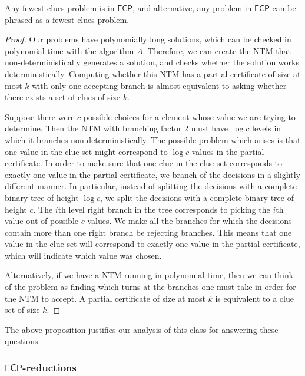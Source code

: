 \documentclass[runningheads,a4paper]{llncs}
\begin{document}
\begin{proposition}
Any fewest clues problem is in $\mathsf{FCP}$, and alternative, any problem in $\mathsf{FCP}$ can be phrased as a fewest clues problem.
\end{proposition}

\begin{proof}
Our problems have polynomially long solutions, which can be checked in polynomial time with the algorithm $A$. Therefore, we can create the NTM that non-deterministically generates a solution, and checks whether the solution works deterministically. Computing whether this NTM has a partial certificate of size at most $k$ with only one accepting branch is almost equivalent to asking whether there exists a set of clues of size $k$. 

Suppose there were $c$ possible choices for a element whose value we are trying to determine. Then the NTM with branching factor $2$ must have $\log c$ levels in which it branches non-deterministically. The possible problem which arises is that one value in the clue set might correspond to $\log c$ values in the partial certificate. In order to make sure that one clue in the clue set corresponds to exactly one value in the partial certificate, we branch of the decisions in a slightly different manner. In particular, instead of splitting the decisions with a complete binary tree of height $\log c$, we split the decisions with a complete binary tree of height $c$. The $i$th level right branch in the tree corresponds to picking the $i$th value out of possible $c$ values. We make all the branches for which the decisions contain more than one right branch be rejecting branches. This means that one value in the clue set will correspond to exactly one value in the partial certificate, which will indicate which value was chosen.

Alternatively, if we have a NTM running in polynomial time, then we can think of the problem as finding which turns at the branches one must take in order for the NTM to accept. A partial certificate of size at most $k$ is equivalent to a clue set of size $k$.
\end{proof}

The above proposition justifies our analysis of this class for answering these questions.

\subsubsection{$\mathsf{FCP}$-reductions}
\end{document}
